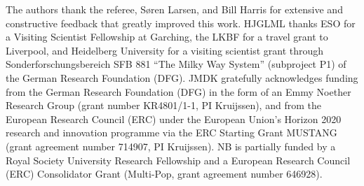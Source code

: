 \documentclass{aa}
\begin{document}
\begin{acknowledgements}

The authors thank the referee, S\o ren Larsen, and Bill Harris for extensive and constructive feedback that greatly improved this work.
 HJGLML thanks ESO for a Visiting Scientist Fellowship at Garching, the LKBF for a travel grant to Liverpool, and Heidelberg University for a visiting scientist grant through Sonderforschungsbereich SFB 881 ``The Milky Way System'' (subproject P1) of the German Research Foundation (DFG). JMDK gratefully acknowledges funding from the German Research Foundation (DFG) in the form of an Emmy Noether Research Group (grant number KR4801/1-1, PI Kruijssen), and from the European Research Council (ERC) under the European Union's Horizon 2020 research and innovation programme via the ERC Starting Grant MUSTANG (grant agreement number 714907, PI Kruijssen). NB is partially funded by a Royal Society University Research Fellowship and a European Research Council (ERC) Consolidator Grant (Multi-Pop, grant agreement number 646928).

\end{acknowledgements}





\end{document}

